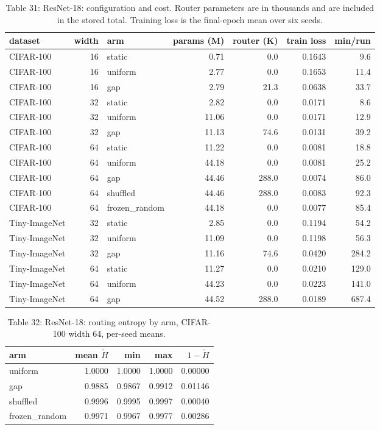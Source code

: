 \documentclass{article}
\begin{document}
\begin{table}
\caption{Table 31: ResNet-18: configuration and cost. Router parameters are in thousands and
are included in the stored total. Training loss is the final-epoch mean
over six seeds.}

\begin{tabular}{l r l rr r r}
\toprule
dataset & width & arm & params (M) & router (K) & train loss & min/run \\
\midrule
CIFAR‑100 & 16 & static & 0.71 & 0.0 & 0.1643 & 9.6 \\
CIFAR‑100 & 16 & uniform & 2.77 & 0.0 & 0.1653 & 11.4 \\
CIFAR‑100 & 16 & gap & 2.79 & 21.3 & 0.0638 & 33.7 \\
CIFAR‑100 & 32 & static & 2.82 & 0.0 & 0.0171 & 8.6 \\
CIFAR‑100 & 32 & uniform & 11.06 & 0.0 & 0.0171 & 12.9 \\
CIFAR‑100 & 32 & gap & 11.13 & 74.6 & 0.0131 & 39.2 \\
CIFAR‑100 & 64 & static & 11.22 & 0.0 & 0.0081 & 18.8 \\
CIFAR‑100 & 64 & uniform & 44.18 & 0.0 & 0.0081 & 25.2 \\
CIFAR‑100 & 64 & gap & 44.46 & 288.0 & 0.0074 & 86.0 \\
CIFAR‑100 & 64 & shuffled & 44.46 & 288.0 & 0.0083 & 92.3 \\
CIFAR‑100 & 64 & frozen\_random & 44.18 & 0.0 & 0.0077 & 85.4 \\
Tiny‑ImageNet & 32 & static & 2.85 & 0.0 & 0.1194 & 54.2 \\
Tiny‑ImageNet & 32 & uniform & 11.09 & 0.0 & 0.1198 & 56.3 \\
Tiny‑ImageNet & 32 & gap & 11.16 & 74.6 & 0.0420 & 284.2 \\
Tiny‑ImageNet & 64 & static & 11.27 & 0.0 & 0.0210 & 129.0 \\
Tiny‑ImageNet & 64 & uniform & 44.23 & 0.0 & 0.0223 & 141.0 \\
Tiny‑ImageNet & 64 & gap & 44.52 & 288.0 & 0.0189 & 687.4 \\
\bottomrule
\end{tabular}
\end{table}

\begin{table}
\caption{Table 32: ResNet-18: routing entropy by arm, CIFAR-100 width 64, per-seed
means.}

\begin{tabular}{l rrr r}
\toprule
arm & mean $\tilde H$ & min & max & $1-\tilde H$ \\
\midrule
uniform & 1.0000 & 1.0000 & 1.0000 & 0.00000 \\
gap & 0.9885 & 0.9867 & 0.9912 & 0.01146 \\
shuffled & 0.9996 & 0.9995 & 0.9997 & 0.00040 \\
frozen\_random & 0.9971 & 0.9967 & 0.9977 & 0.00286 \\
\bottomrule
\end{tabular}
\end{table}
\end{document}
